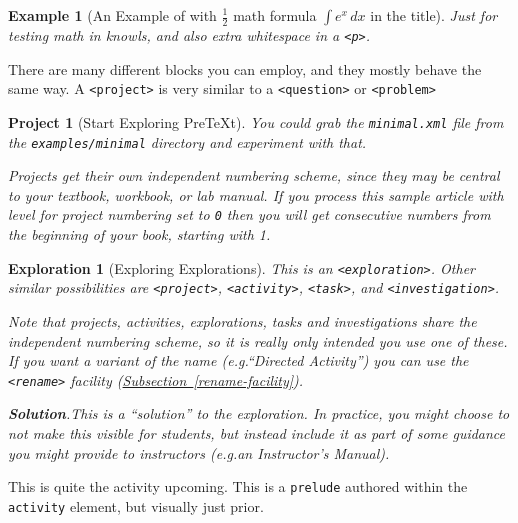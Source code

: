 \documentclass{sn-jnl}
\theoremstyle{thmstyleone}%
\theoremstyle{thmstyletwo}%
\newtheorem{exploration}[theorem]{Exploration}
\newtheorem{example}[theorem]{Example}
\newtheorem{project}[theorem]{Project}
\theoremstyle{thmstylethree}%
\newcommand{\blocktitlefont}{\relax}
\newcommand{\xreffont}{\relax}
\newcommand{\mono}[1]{\texttt{#1}}
\newcommand{\pubtitle}[1]{\textsl{#1}}
\numberwithin{equation}{section}
\begin{document}
\begin{example}[An Example of with \(\frac12\) math formula \(\displaystyle{\int e^x \, dx}\) in the title]\label{example-math-title}%
%
Just for testing math in knowls, and also extra whitespace in a \mono{<p>}.%
\end{example}
There are many different blocks you can employ, and they mostly behave the same way.  A \mono{<project>} is very similar to a \mono{<question>} or \mono{<problem>}%
\begin{project}[Start Exploring PreTeXt]\label{section-interesting-corollary-5-3-8}%
%
You could grab the \mono{minimal.xml} file from the \mono{examples/minimal} directory and experiment with that.%
\par
Projects get their own independent numbering scheme, since they may be central to your textbook, workbook, or lab manual.  If you process this sample article with level for project numbering set to \mono{0} then you will get consecutive numbers from the beginning of your book, starting with 1.%
\end{project}%
\begin{exploration}[Exploring Explorations]\label{section-interesting-corollary-5-3-9}%
%
This is an \mono{<exploration>}.  Other similar possibilities are \mono{<project>}, \mono{<activity>}, \mono{<task>}, and \mono{<investigation>}.%
\par
Note that projects, activities, explorations, tasks and investigations \emph{share} the independent numbering scheme, so it is really only intended you use one of these.  If you want a variant of the name (e.g.\@ ``Directed Activity'') you can use the \mono{<rename>} facility (\hyperref[rename-facility]{Subsection~{\xreffont\ref{rename-facility}}}).%
\par\smallskip%
\noindent\textbf{\blocktitlefont Solution}.\hypertarget{section-interesting-corollary-5-3-9-3}{}\quad{}This is a ``solution'' to the exploration.  In practice, you might choose to not make this visible for students, but instead include it as part of some guidance you might provide to instructors (e.g.\@ an \pubtitle{Instructor's Manual}).%
\end{exploration}%
\par
This is quite the activity upcoming.  This is a \mono{prelude} authored within the \mono{activity} element, but visually just prior.%
\end{document}
